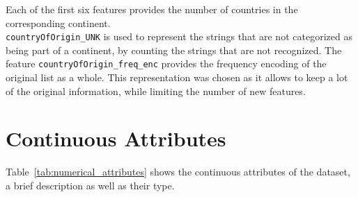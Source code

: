 Each of the first six features provides the number of countries in the corresponding continent.\\
\texttt{countryOfOrigin\_UNK} is used to represent the strings that are not categorized as being part of a
continent, by counting the strings that are not recognized.
The feature \texttt{countryOfOrigin\_freq\_enc} provides the frequency encoding of the
original list as a whole.
This representation was chosen as it allows to
keep a lot of the original information, while limiting the number of new features.\\




\section{Continuous Attributes}
Table~\ref{tab:numerical_attributes} shows the continuous attributes of the dataset,
a brief description as well as their type.
